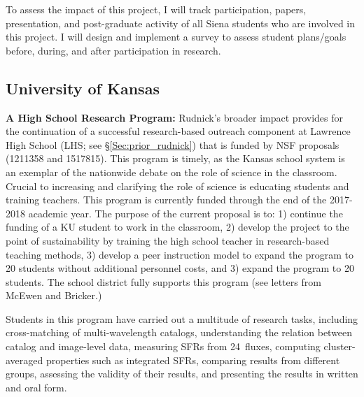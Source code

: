 \documentclass[11pt, preprint]{aastex}
\begin{document}
{To assess the impact of this project, I will track participation, papers, 
presentation, and post-graduate activity of all Siena students
who are involved in this project.  I will design and implement a survey to 
assess student plans/goals before, during, and after
participation in research.

\subsection{University of Kansas}
\label{BI}
\noindent \textbf{A High School Research Program:} Rudnick's broader
impact provides for the continuation of a successful research-based
outreach component at Lawrence High School (LHS; see
\S\ref{Sec:prior_rudnick}) that is funded by NSF proposals (1211358 and 1517815). This program is timely, as the Kansas
school system is an exemplar of the nationwide debate on the role of
science in the classroom. Crucial to increasing and clarifying the
role of science is educating students and training teachers.
This program is currently funded through the end of the 2017-2018
academic year. The purpose of the current proposal is to: 1) continue
the funding of a KU student to work in the classroom, 2) develop the
project to the point of sustainability by training the high school
teacher in research-based teaching methods, 3) develop a peer
instruction model to expand the program to 20 students without
additional personnel costs, and 3) expand the program to 20
students. The school district fully supports this program (see letters
from McEwen and Bricker.)

Students in this program have carried out a multitude of research tasks, including cross-matching of multi-wavelength catalogs, understanding the relation between catalog and image-level data, measuring SFRs from 24\micron\ fluxes, computing cluster-averaged properties such as integrated SFRs, comparing results from different groups, assessing the validity of their results, and presenting the results in written and oral form.

}
\end{document}
